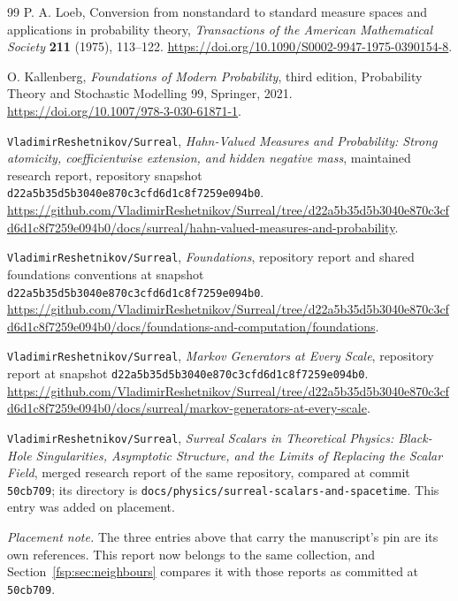 \documentclass[11pt,a4paper]{article}
\numberwithin{equation}{section}
\theoremstyle{definition}
\theoremstyle{remark}
\newcommand{\pin}{\texttt{d22a5b35d5b3040e870c3cfd6d1c8f7259e094b0}}
\newcommand{\repo}{\texttt{VladimirReshetnikov/Surreal}}
\begin{document}
\begin{thebibliography}{99}
P. A. Loeb, Conversion from nonstandard to standard measure spaces and
applications in probability theory, \emph{Transactions of the American
Mathematical Society} \textbf{211} (1975), 113--122.
\url{https://doi.org/10.1090/S0002-9947-1975-0390154-8}.

O. Kallenberg, \emph{Foundations of Modern Probability}, third edition,
Probability Theory and Stochastic Modelling 99, Springer, 2021.
\url{https://doi.org/10.1007/978-3-030-61871-1}.

\repo, \emph{Hahn-Valued Measures and Probability: Strong atomicity,
coefficientwise extension, and hidden negative mass}, maintained
research report, repository snapshot \pin.
\url{https://github.com/VladimirReshetnikov/Surreal/tree/d22a5b35d5b3040e870c3cfd6d1c8f7259e094b0/docs/surreal/hahn-valued-measures-and-probability}.

\repo, \emph{Foundations}, repository report and shared foundations
conventions at snapshot \pin.
\url{https://github.com/VladimirReshetnikov/Surreal/tree/d22a5b35d5b3040e870c3cfd6d1c8f7259e094b0/docs/foundations-and-computation/foundations}.

\repo, \emph{Markov Generators at Every Scale}, repository report
at snapshot \pin.
\url{https://github.com/VladimirReshetnikov/Surreal/tree/d22a5b35d5b3040e870c3cfd6d1c8f7259e094b0/docs/surreal/markov-generators-at-every-scale}.

\repo, \emph{Surreal Scalars in Theoretical Physics: Black-Hole
Singularities, Asymptotic Structure, and the Limits of Replacing the Scalar
Field}, merged research report of the same repository, compared at commit
\texttt{50cb709}; its directory is
\nolinkurl{docs/physics/surreal-scalars-and-spacetime}. This entry was added
on placement.

\medskip\noindent\emph{Placement note.} The three entries above that carry
the manuscript's pin are its own references. This report now belongs to the
same collection, and Section~\ref{fsp:sec:neighbours} compares it with those
reports as committed at \texttt{50cb709}.

\end{thebibliography}
\end{document}
